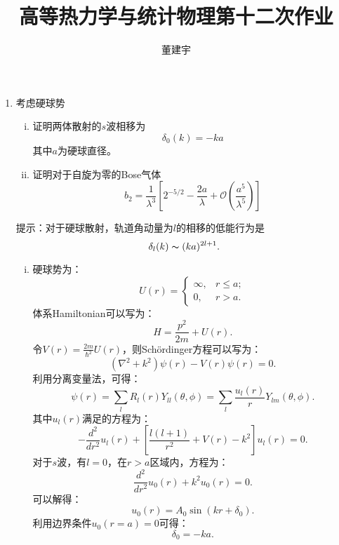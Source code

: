 \documentclass[reqno,a4paper,12pt]{amsart}
\title{高等热力学与统计物理第十二次作业}
\author{董建宇}
\begin{document}
\maketitle

\begin{enumerate}[1.]

\item 考虑硬球势
\begin{enumerate}[i)]

\item 证明两体散射的$s$波相移为
\[
	\delta_0(k) = -ka
\]
其中$a$为硬球直径。

\item 证明对于自旋为零的Bose气体
\[
	b_2 = \frac{1}{\lambda^3} \left[ 2^{-5/2} - \frac{2a}{\lambda} + \mathcal{O}\left( \frac{a^5}{\lambda^5} \right) \right]
\]

\end{enumerate}
提示：对于硬球散射，轨道角动量为$l$的相移的低能行为是
\[
	\delta_l(k) \thicksim (ka)^{2l+1}.
\]

\begin{tcolorbox}[breakable, colframe = black, colback = black!5!white]
\begin{enumerate}[i)]
\item 硬球势为：
\[
	U(r) = \left\{ \begin{array}{ll}
		\infty, & r \leq a; \\
		0, & r>a.
	\end{array} \right.
\]
体系Hamiltonian可以写为：
\[
	H = \frac{p^2}{2m} + U(r).
\]
令$V(r) = \frac{2m}{\hbar^2}U(r)$，则Sch\"ordinger方程可以写为：
\[
	(\nabla^2+k^2)\psi(r) - V(r)\psi(r) = 0.
\]
利用分离变量法，可得：
\[
	\psi(r) = \sum_l R_l(r) Y_{ll}(\theta,\phi) = \sum_l \frac{u_l(r)}{r}Y_{lm}(\theta,\phi).
\]
其中$u_l(r)$满足的方程为：
\[
	-\frac{d^2}{dr^2}u_l(r) + \left[ \frac{l(l+1)}{r^2} + V(r) - k^2 \right] u_l(r) = 0.
\]
对于$s$波，有$l=0$，在$r>a$区域内，方程为：
\[
	\frac{d^2}{dr^2}u_0(r) + k^2 u_0(r) = 0.
\]
可以解得：
\[
	u_0(r) = A_0\sin(kr+\delta_0).
\]
利用边界条件$u_0(r=a) = 0$可得：
\[
	\delta_0 = -ka.
\]


\end{enumerate}
\end{tcolorbox}
\end{enumerate}
\end{document}
